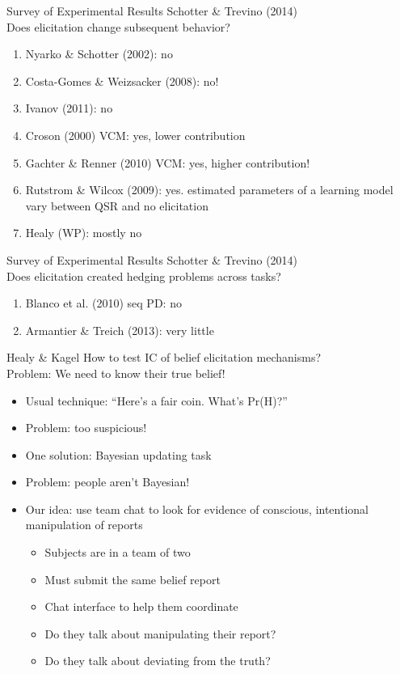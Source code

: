 \begin{frame}{Survey of Experimental Results}
    Schotter \& Trevino (2014)\\
    Does elicitation change subsequent behavior?
    \begin{enumerate}
        \item Nyarko \& Schotter (2002): no
        \item Costa-Gomes \& Weizsacker (2008): no!
        \item Ivanov (2011): no
        \item Croson (2000) VCM: yes, lower contribution
        \item Gachter \& Renner (2010) VCM: yes, higher contribution!
        \item Rutstrom \& Wilcox (2009): yes. estimated parameters of a learning model vary between QSR and no elicitation
        \item Healy (WP): mostly no
    \end{enumerate}
\end{frame}

\begin{frame}{Survey of Experimental Results}
    Schotter \& Trevino (2014)\\
    Does elicitation created hedging problems across tasks?
    \begin{enumerate}
        \item Blanco et al. (2010) seq PD: no
        \item Armantier \& Treich (2013): very little
    \end{enumerate}
\end{frame}


\begin{frame}{Healy \& Kagel}
How to test IC of belief elicitation mechanisms?\\
Problem: We need to know their true belief!
\begin{itemize}
    \item Usual technique: ``Here's a fair coin. What's Pr(H)?''
    \item Problem: too suspicious!
    \item One solution: Bayesian updating task
    \item Problem: people aren't Bayesian!
    \item Our idea: use team chat to look for evidence of conscious, intentional manipulation of reports
    \begin{itemize}
        \item Subjects are in a team of two
        \item Must submit the same belief report
        \item Chat interface to help them coordinate
        \item Do they talk about manipulating their report?
        \item Do they talk about deviating from the truth?
    \end{itemize}
\end{itemize}    
\end{frame}

